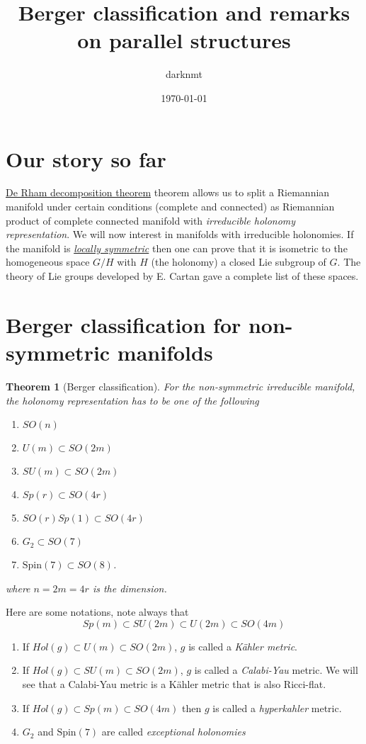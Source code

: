 \documentclass[11pt]{article}
\author{darknmt}
\date{\today}
\title{Berger classification and remarks on parallel structures}
\newtheorem{theorem}{Theorem}
\begin{document}
\maketitle
\tableofcontents


\section*{Our story so far}
\label{sec:org0d0d39d}

\href{./de-rham-decomposition.org}{De Rham decomposition theorem} theorem allows us to split a Riemannian manifold under certain
conditions (complete and connected) as Riemannian product of complete connected manifold with
\emph{irreducible holonomy representation}. We will now interest in manifolds with irreducible
holonomies. If the manifold is \href{./symmetric-space.org}{\emph{locally symmetric}} then one can prove that it is isometric to the
homogeneous space \(G/H\) with \(H\) (the holonomy) a closed Lie subgroup of \(G\). The theory of Lie
groups developed by E. Cartan gave a complete list of these spaces.


\section*{Berger classification for non-symmetric manifolds}
\label{sec:org4589b9d}

\begin{theorem}[Berger classification]
\label{thm:Berger}
\label{orge377abb}
For the non-symmetric irreducible manifold, the holonomy representation has to be one of the
following
\begin{enumerate}
\item \(SO(n)\)
\item \(U(m)\subset SO(2m)\)
\item \(SU(m)\subset SO(2m)\)
\item \(Sp(r) \subset SO(4r)\)
\item \(SO(r)Sp(1) \subset SO(4r)\)
\item \(G_2\subset SO(7)\)
\item \(\text{Spin}(7)\subset SO(8)\).
\end{enumerate}
where \(n=2m=4r\) is the dimension.
\end{theorem}

Here are some notations, note always that
\[
Sp(m)\subset SU(2m)\subset U(2m)\subset SO(4m)
\]
\begin{enumerate}
\item If \(Hol(g)\subset U(m)\subset SO(2m)\), \(g\) is called a \emph{Kähler metric}.
\item If \(Hol(g)\subset SU(m)\subset SO(2m)\), \(g\) is called a \emph{Calabi-Yau} metric. We will see that a
Calabi-Yau metric is a Kähler metric that is also Ricci-flat.
\item If \(Hol(g)\subset Sp(m)\subset SO(4m)\) then \(g\) is called a \emph{hyperkahler} metric.
\item \(G_2\) and \(\text{Spin}(7)\) are called \emph{exceptional holonomies}
\end{enumerate}
\end{document}
